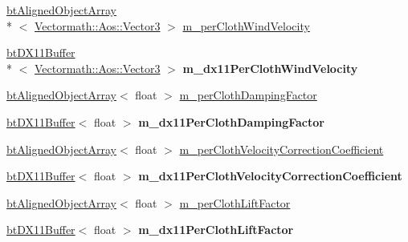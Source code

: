 \begin{DoxyCompactItemize}
\item 
\hyperlink{classbt_aligned_object_array}{bt\+Aligned\+Object\+Array}\\*
$<$ \hyperlink{class_vectormath_1_1_aos_1_1_vector3}{Vectormath\+::\+Aos\+::\+Vector3} $>$ \hyperlink{classbt_d_x11_soft_body_solver_a987c1c220a3f6c88c67bf2c1d781f3e6}{m\+\_\+per\+Cloth\+Wind\+Velocity}
\item 
\hypertarget{classbt_d_x11_soft_body_solver_a89195cc6782aa7be5352c05f513673f8}{\hyperlink{classbt_d_x11_buffer}{bt\+D\+X11\+Buffer}\\*
$<$ \hyperlink{class_vectormath_1_1_aos_1_1_vector3}{Vectormath\+::\+Aos\+::\+Vector3} $>$ {\bfseries m\+\_\+dx11\+Per\+Cloth\+Wind\+Velocity}}\label{classbt_d_x11_soft_body_solver_a89195cc6782aa7be5352c05f513673f8}

\item 
\hyperlink{classbt_aligned_object_array}{bt\+Aligned\+Object\+Array}$<$ float $>$ \hyperlink{classbt_d_x11_soft_body_solver_a57e1ce28a6d9ffd31bb4a29b8071e84d}{m\+\_\+per\+Cloth\+Damping\+Factor}
\item 
\hypertarget{classbt_d_x11_soft_body_solver_a19833d53cc8be05d1a37b3acf170ad5f}{\hyperlink{classbt_d_x11_buffer}{bt\+D\+X11\+Buffer}$<$ float $>$ {\bfseries m\+\_\+dx11\+Per\+Cloth\+Damping\+Factor}}\label{classbt_d_x11_soft_body_solver_a19833d53cc8be05d1a37b3acf170ad5f}

\item 
\hyperlink{classbt_aligned_object_array}{bt\+Aligned\+Object\+Array}$<$ float $>$ \hyperlink{classbt_d_x11_soft_body_solver_ada99231e53db3fad0b91154fbc14e867}{m\+\_\+per\+Cloth\+Velocity\+Correction\+Coefficient}
\item 
\hypertarget{classbt_d_x11_soft_body_solver_ac87806fef62b2153fb25d19e64e1be5f}{\hyperlink{classbt_d_x11_buffer}{bt\+D\+X11\+Buffer}$<$ float $>$ {\bfseries m\+\_\+dx11\+Per\+Cloth\+Velocity\+Correction\+Coefficient}}\label{classbt_d_x11_soft_body_solver_ac87806fef62b2153fb25d19e64e1be5f}

\item 
\hyperlink{classbt_aligned_object_array}{bt\+Aligned\+Object\+Array}$<$ float $>$ \hyperlink{classbt_d_x11_soft_body_solver_a47906e669eaa051a3d86d355aef9b572}{m\+\_\+per\+Cloth\+Lift\+Factor}
\item 
\hypertarget{classbt_d_x11_soft_body_solver_a02ef28ec51910399946a2b45598e4484}{\hyperlink{classbt_d_x11_buffer}{bt\+D\+X11\+Buffer}$<$ float $>$ {\bfseries m\+\_\+dx11\+Per\+Cloth\+Lift\+Factor}}\label{classbt_d_x11_soft_body_solver_a02ef28ec51910399946a2b45598e4484}


\end{DoxyCompactItemize}
